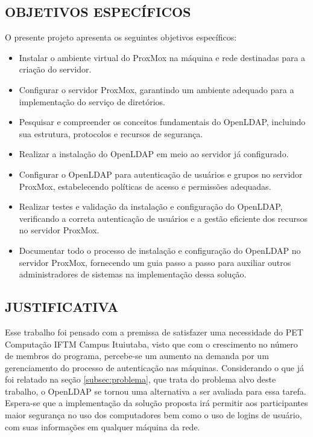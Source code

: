\subsection{OBJETIVOS ESPECÍFICOS}
\label{subsec:objetivos-específicos}
O presente projeto apresenta os seguintes objetivos específicos:
\begin{itemize}
    \item Instalar o ambiente virtual do ProxMox na máquina e rede destinadas para 
    a criação do servidor.
	\item Configurar o servidor ProxMox, garantindo um ambiente adequado para a implementação do serviço de diretórios.
    \item Pesquisar e compreender os conceitos fundamentais do OpenLDAP, incluindo sua estrutura, protocolos e recursos de segurança.
    \item Realizar a instalação do OpenLDAP em meio ao servidor já configurado.
    \item Configurar o OpenLDAP para autenticação de usuários e grupos no servidor ProxMox, estabelecendo políticas de acesso e permissões adequadas.
    \item Realizar testes e validação da instalação e configuração do OpenLDAP, verificando a correta autenticação de usuários e a gestão eficiente dos recursos no servidor ProxMox.
    \item Documentar todo o processo de instalação e configuração do OpenLDAP no servidor ProxMox, fornecendo um guia passo a passo para auxiliar outros administradores de sistemas na implementação dessa solução.
\end{itemize}

\subsection{JUSTIFICATIVA}
\label{subsec:justificativa}
Esse trabalho foi pensado com a premissa de satisfazer uma necessidade do PET Computação IFTM Campus Ituiutaba, visto que com o crescimento no número de membros do programa, percebe-se um aumento na demanda por um gerenciamento do processo de autenticação nas máquinas. Considerando o que já foi relatado na seção \ref{subsec:problema}, que trata do problema alvo deste trabalho, o OpenLDAP se tornou uma alternativa a ser avaliada para essa tarefa. Espera-se que a implementação da solução proposta irá permitir aos participantes maior segurança no uso dos computadores bem como o uso de logins de usuário, com suas informações em qualquer máquina da rede.

